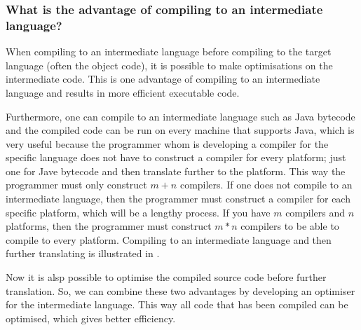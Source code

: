 \subsubsection{What is the advantage of compiling to an intermediate language?}

When compiling to an intermediate language before compiling to the target
language (often the object code), it is possible to make optimisations on the
intermediate code. This is one advantage of compiling to an intermediate
language and results in more efficient executable code.

Furthermore, one can compile to an intermediate language such as Java bytecode
and the compiled code can be run on every machine that supports Java, which is
very useful because the programmer whom is developing a compiler for the
specific language does not have to construct a compiler for every platform; just
one for Jave bytecode and then translate further to the platform. This way the
programmer must only construct $m+n$ compilers. If one does not compile to an
intermediate language, then the programmer must construct a compiler for each
specific platform, which will be a lengthy process. If you have $m$ compilers
and $n$ platforms, then the programmer must construct $m*n$ compilers to be able
to compile to every platform.  Compiling to an intermediate language and then
further translating is illustrated in .



Now it is alsp possible to optimise the compiled source code before further
translation. So, we can combine these two advantages by developing an optimiser
for the intermediate language. This way all code that has been compiled can be
optimised, which gives better efficiency.

